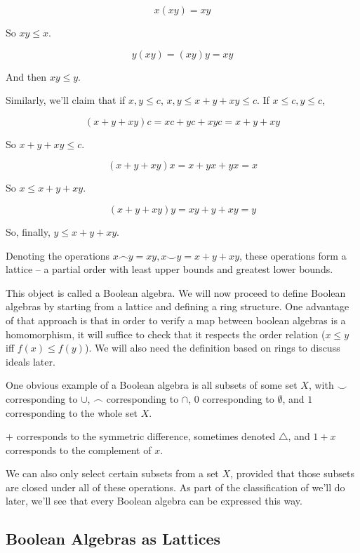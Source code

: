 \documentclass{article}
\begin{document}
      \[ x(xy) = xy\]

      So $xy \leq x$.

      \[ y(xy) = (xy)y = xy\]

      And then $xy \leq y$.

      Similarly, we'll claim that if $x,y \leq c$, $x,y \leq x + y + xy \leq c$.
      If $x \leq c, y \leq c$,

      \[(x + y + xy)c = xc + yc + xyc = x + y + xy\]

      So $x + y + xy \leq c$.

      \[(x + y + xy)x = x + yx + yx = x\]

      So $x \leq x + y + xy$.

      \[(x + y + xy)y = xy + y + xy = y\]

      So, finally, $y \leq x + y + xy$.

      Denoting the operations $x \frown y = xy, x \smile y = x + y + xy$, these
      operations form a lattice -- a partial order with least upper bounds and
      greatest lower bounds.

      This object is called a Boolean algebra. We will now proceed to define
      Boolean algebras by starting from a lattice and defining a ring structure.
      One advantage of that approach is that in order to verify a map between
      boolean algebras is a homomorphism, it will suffice to check that it
      respects the order relation ($x \leq y$ iff $f(x) \leq f(y)$). We will also
      need the definition based on rings to discuss ideals later.

      One obvious example of a Boolean algebra is all subsets of some set $X$,
      with $\smile$ corresponding to $\cup$, $\frown$ corresponding to $\cap$,
      $0$ corresponding to $\emptyset$, and $1$ corresponding to the whole set
      $X$.

      $+$ corresponds to the symmetric difference, sometimes denoted
      $\triangle$, and $1 + x$ corresponds to the complement of $x$.

      We can also only select certain subsets from a set $X$, provided that
      those subsets are closed under all of these operations. As part of the
      classification of we'll do later, we'll see that every Boolean algebra can
      be expressed this way.

    \subsection{Boolean Algebras as Lattices}
\end{document}
